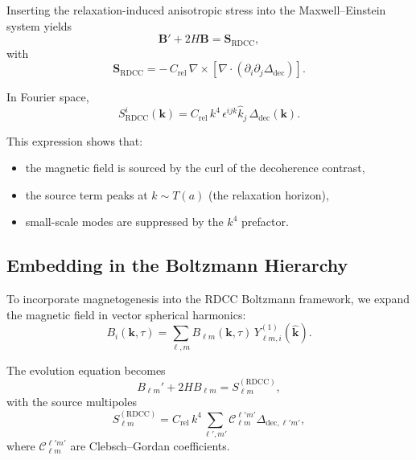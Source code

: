 \documentclass[11pt,a4paper]{article}
\begin{document}
Inserting the relaxation-induced anisotropic stress into the Maxwell–Einstein system yields
\begin{equation}
\mathbf{B}' + 2H\mathbf{B}
=
\mathbf{S}_{\mathrm{RDCC}},
\end{equation}
with
\begin{equation}
\mathbf{S}_{\mathrm{RDCC}}
=
-\,C_{\mathrm{rel}}\,
\nabla \times
\left[
\nabla \cdot
\left(
\partial_{i}\partial_{j}\Delta_{\mathrm{dec}}
\right)
\right].
\end{equation}

In Fourier space,
\begin{equation}
S_{\mathrm{RDCC}}^{i}(\mathbf{k})
=
C_{\mathrm{rel}}\,
k^{4}\,
\epsilon^{ijk}
\hat{k}_{j}\,
\Delta_{\mathrm{dec}}(\mathbf{k}).
\label{eq:SRDCCFourier}
\end{equation}

This expression shows that:
\begin{itemize}
\item the magnetic field is sourced by the curl of the decoherence contrast,
\item the source term peaks at $k \sim T(a)$ (the relaxation horizon),
\item small-scale modes are suppressed by the $k^{4}$ prefactor.
\end{itemize}

\subsection{Embedding in the Boltzmann Hierarchy}

To incorporate magnetogenesis into the RDCC Boltzmann framework, we expand the magnetic
field in vector spherical harmonics:
\begin{equation}
B_{i}(\mathbf{k},\tau)
=
\sum_{\ell,m}
B_{\ell m}(\mathbf{k},\tau)\,
Y^{(1)}_{\ell m,i}(\hat{\mathbf{k}}).
\end{equation}

The evolution equation becomes
\begin{equation}
B_{\ell m}' + 2H B_{\ell m}
=
S_{\ell m}^{(\mathrm{RDCC})},
\label{eq:BoltzmannB}
\end{equation}
with the source multipoles
\begin{equation}
S_{\ell m}^{(\mathrm{RDCC})}
=
C_{\mathrm{rel}}\,k^{4}
\sum_{\ell',m'}
\mathcal{C}_{\ell m}^{\ell' m'}
\Delta_{\mathrm{dec},\ell' m'},
\end{equation}
where $\mathcal{C}_{\ell m}^{\ell' m'}$ are Clebsch–Gordan coefficients.
\end{document}
